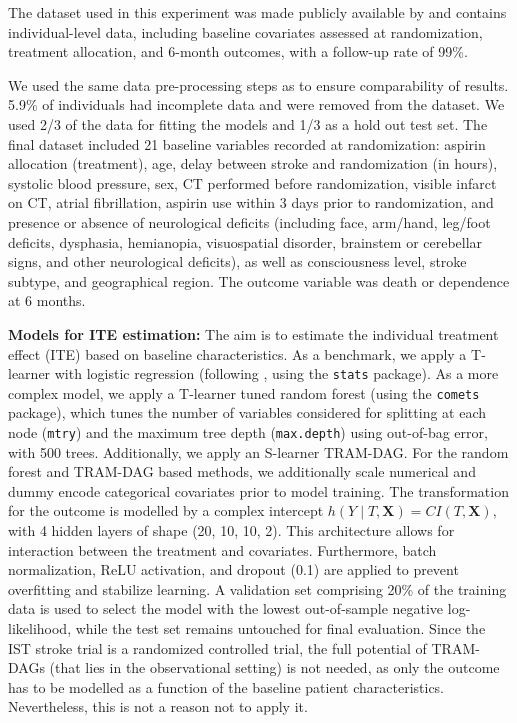 The dataset used in this experiment was made publicly available by \citet{sandercock2011} and contains individual-level data, including baseline covariates assessed at randomization, treatment allocation, and 6-month outcomes, with a follow-up rate of 99\%.

We used the same data pre-processing steps as \citet{chen2025} to ensure comparability of results. 5.9\% of individuals had incomplete data and were removed from the dataset. We used 2/3 of the data for fitting the models and 1/3 as a hold out test set. The final dataset included 21 baseline variables recorded at randomization: aspirin allocation (treatment), age, delay between stroke and randomization (in hours), systolic blood pressure, sex, CT performed before randomization, visible infarct on CT, atrial fibrillation, aspirin use within 3 days prior to randomization, and presence or absence of neurological deficits (including face, arm/hand, leg/foot deficits, dysphasia, hemianopia, visuospatial disorder, brainstem or cerebellar signs, and other neurological deficits), as well as consciousness level, stroke subtype, and geographical region. The outcome variable was death or dependence at 6 months.


\textbf{Models for ITE estimation: } The aim is to estimate the individual treatment effect (ITE) based on baseline characteristics. As a benchmark, we apply a T-learner with logistic regression (following \citet{chen2025}, using the \texttt{stats} package). As a more complex model, we apply a T-learner tuned random forest (using the \texttt{comets} package), which tunes the number of variables considered for splitting at each node (\texttt{mtry}) and the maximum tree depth (\texttt{max.depth}) using out-of-bag error, with 500 trees. Additionally, we apply an S-learner TRAM-DAG. For the random forest and TRAM-DAG based methods, we additionally scale numerical and dummy encode categorical covariates prior to model training. The transformation for the outcome is modelled by a complex intercept $h(Y \mid T, \mathbf{X}) = CI(T, \mathbf{X})$, with 4 hidden layers of shape (20, 10, 10, 2). This architecture allows for interaction between the treatment and covariates. Furthermore, batch normalization, ReLU activation, and dropout (0.1) are applied to prevent overfitting and stabilize learning. A validation set comprising 20\% of the training data is used to select the model with the lowest out-of-sample negative log-likelihood, while the test set remains untouched for final evaluation. Since the IST stroke trial is a randomized controlled trial, the full potential of TRAM-DAGs (that lies in the observational setting) is not needed, as only the outcome has to be modelled as a function of the baseline patient characteristics. Nevertheless, this is not a reason not to apply it.

